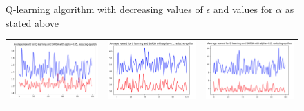 \documentclass{article}
\begin{document}
\begin{figure}
  \caption{Q-learning algorithm with decreasing values of $\epsilon$ and values for $\alpha$ as stated above}
  \end{figure}
  
  
\begin{figure}
\begin{tabular}{ccc}
  \includegraphics[scale=0.2]{avg_alpha0p05e.png} &   \includegraphics[scale=0.2]{avg_alpha0p1e.png} & \includegraphics[scale=0.2]{avg_alpha0p2e.png} \\

\end{tabular}
\end{figure}
\end{document}
